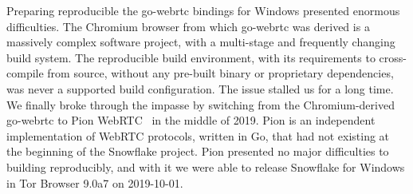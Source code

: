 \documentclass[letterpaper,twocolumn]{article}
\begin{document}
Preparing reproducible the go-webrtc bindings for Windows
presented enormous difficulties.
The Chromium browser from which go-webrtc was derived
is a massively complex software project,
with a multi-stage and frequently changing build system.
The reproducible build environment,
with its requirements to
cross-compile from source,
without any pre-built binary or proprietary dependencies,
was never a supported build configuration.
The issue stalled us for a long time.
We finally broke through the impasse
by switching from the Chromium-derived go-webrtc
to Pion WebRTC~\cite{pion-webrtc} in the middle of 2019.
Pion is an independent implementation of WebRTC protocols, written in Go,
that had not existing at the beginning of the Snowflake project.
Pion presented no major difficulties to building reproducibly,
and with it we were able to release Snowflake for Windows
in Tor Browser 9.0a7 on \mbox{2019-10-01}.
\end{document}
